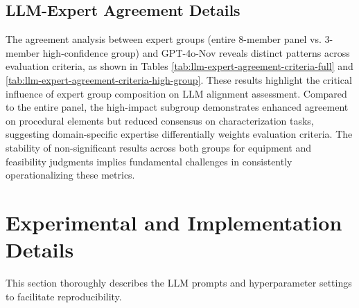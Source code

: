 


\subsection{LLM-Expert Agreement Details}
\label{subsec:llm-expert-agreement-details}

The agreement analysis between expert groups (entire 8-member panel vs. 3-member high-confidence group) and GPT-4o-Nov reveals distinct patterns across evaluation criteria, as shown in Tables \ref{tab:llm-expert-agreement-criteria-full} and \ref{tab:llm-expert-agreement-criteria-high-group}.
These results highlight the critical influence of expert group composition on LLM alignment assessment. Compared to the entire panel, the high-impact subgroup demonstrates enhanced agreement on procedural elements but reduced consensus on characterization tasks, suggesting domain-specific expertise differentially weights evaluation criteria. The stability of non-significant results across both groups for equipment and feasibility judgments implies fundamental challenges in consistently operationalizing these metrics.



\vspace{2em}
\section{Experimental and Implementation Details}
\label{sec:appendix_experiments}

This section thoroughly describes the LLM prompts and hyperparameter settings to facilitate reproducibility.


